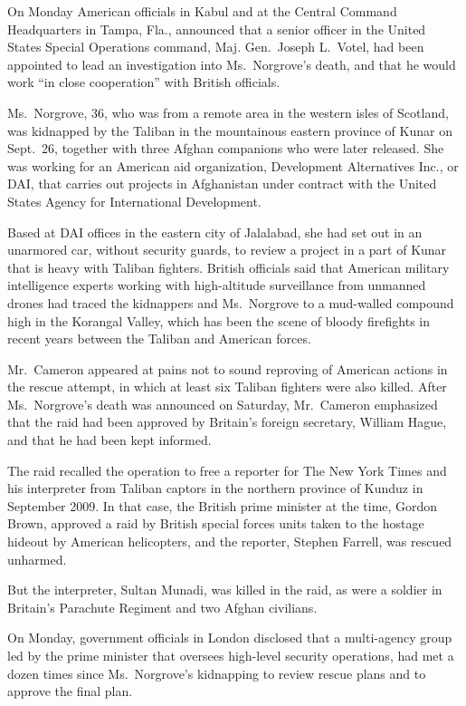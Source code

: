 ﻿\documentclass[12pt]{article}
\begin{document}
On Monday American officials in Kabul and at the Central Command Headquarters in Tampa, Fla.,
announced that a senior officer in the United States Special Operations command, Maj. Gen.~Joseph
L.~Votel, had been appointed to lead an investigation into Ms.~Norgrove's death, and that he would
work ``in close cooperation'' with British officials.

Ms.~Norgrove, 36, who was from a remote area in the western isles of Scotland, was kidnapped by the
Taliban in the mountainous eastern province of Kunar on Sept.~26, together with three Afghan
companions who were later released. She was working for an American aid organization, Development
Alternatives Inc., or DAI, that carries out projects in Afghanistan under contract with the United
States Agency for International Development.

Based at DAI offices in the eastern city of Jalalabad, she had set out in an unarmored car, without
security guards, to review a project in a part of Kunar that is heavy with Taliban fighters. British
officials said that American military intelligence experts working with high-altitude surveillance
from unmanned drones had traced the kidnappers and Ms.~Norgrove to a mud-walled compound high in the
Korangal Valley, which has been the scene of bloody firefights in recent years between the Taliban
and American forces.

Mr.~Cameron appeared at pains not to sound reproving of American actions in the rescue attempt, in
which at least six Taliban fighters were also killed. After Ms.~Norgrove's death was announced on
Saturday, Mr.~Cameron emphasized that the raid had been approved by Britain's foreign secretary,
William Hague, and that he had been kept informed.

The raid recalled the operation to free a reporter for The New York Times and his interpreter from
Taliban captors in the northern province of Kunduz in September 2009. In that case, the British
prime minister at the time, Gordon Brown, approved a raid by British special forces units taken to
the hostage hideout by American helicopters, and the reporter, Stephen Farrell, was rescued
unharmed.

But the interpreter, Sultan Munadi, was killed in the raid, as were a soldier in Britain's Parachute
Regiment and two Afghan civilians.

On Monday, government officials in London disclosed that a multi-agency group led by the prime
minister that oversees high-level security operations, had met a dozen times since Ms.~Norgrove's
kidnapping to review rescue plans and to approve the final plan.
\end{document}
